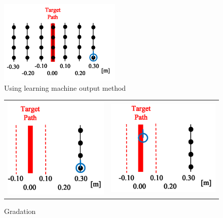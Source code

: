 \documentclass{jarticle}
\begin{document}
\begin{figure}[h!]
  \centering
   \includegraphics[height=40mm]{./figs/k.png}
   \caption{Using learning machine output method}
\end{figure}




\begin{figure}[htbp]
  \begin{tabular}{cc}
    \hspace*{-5mm}
    \begin{minipage}[t]{0.5\hsize}
      \centering
      \includegraphics[keepaspectratio, scale=0.4]{figs/init.png}
      \caption{Composite}
    \end{minipage} &
    \begin{minipage}[t]{0.5\hsize}
      \centering
      \includegraphics[keepaspectratio, scale=0.4]{figs/return.png}
      \caption{Gradation}
    \end{minipage}
  \end{tabular}
\end{figure}
\end{document}
